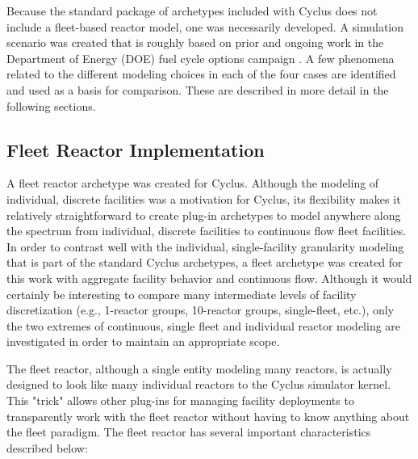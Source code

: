 \documentclass{style}
\begin{document}
\noindent
Because the standard package of archetypes included with Cyclus does not
include a fleet-based reactor model, one was necessarily developed. A
simulation scenario was created that is roughly based on prior and ongoing
work in the Department of Energy (DOE) fuel cycle options campaign \cite{hoffman-eg23-2016}.  A few
phenomena related to the different modeling choices in each of the four cases
are identified and used as a basis for comparison.  These are
described in more detail in the following sections.

\subsection{Fleet Reactor Implementation}

A fleet reactor archetype was created for Cyclus.  Although the modeling of
individual, discrete facilities was a motivation for Cyclus, its flexibility
makes it relatively straightforward to create plug-in archetypes to model
anywhere along the spectrum from individual, discrete facilities to continuous
flow fleet facilities.  In order to contrast well with the individual,
single-facility granularity modeling that is part of the standard Cyclus
archetypes, a fleet archetype was created for this work with aggregate
facility behavior and continuous flow.  Although it would certainly be
interesting to compare many intermediate levels of facility discretization
(e.g., 1-reactor groups, 10-reactor groups, single-fleet, etc.), only the two
extremes of continuous, single fleet and individual reactor modeling are
investigated in order to maintain an appropriate scope.

The fleet reactor, although a single entity modeling many reactors, is
actually designed to look like many individual reactors to the Cyclus
simulator kernel. This "trick" allows other plug-ins for managing facility
deployments to transparently work with the fleet reactor without having to
know anything about the fleet paradigm.  The fleet reactor has several
important characteristics described below:
\end{document}
